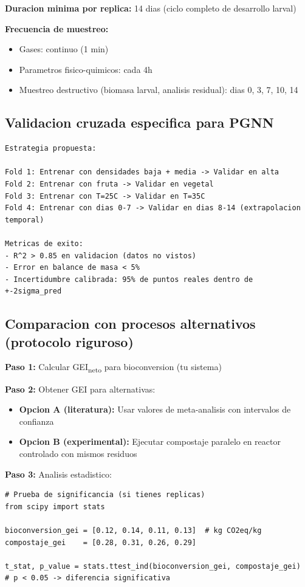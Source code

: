 \documentclass[12pt]{article}
\begin{document}
\textbf{Duracion minima por replica:} 14 dias (ciclo completo de desarrollo larval)

\textbf{Frecuencia de muestreo:}
\begin{itemize}
\item Gases: continuo (1 min)
\item Parametros fisico-quimicos: cada 4h
\item Muestreo destructivo (biomasa larval, analisis residual): dias 0, 3, 7, 10, 14
\end{itemize}

\subsection{Validacion cruzada especifica para PGNN}

\begin{lstlisting}[caption=Estrategia de validacion cruzada]
Estrategia propuesta:

Fold 1: Entrenar con densidades baja + media -> Validar en alta
Fold 2: Entrenar con fruta -> Validar en vegetal
Fold 3: Entrenar con T=25C -> Validar en T=35C
Fold 4: Entrenar con dias 0-7 -> Validar en dias 8-14 (extrapolacion temporal)

Metricas de exito:
- R^2 > 0.85 en validacion (datos no vistos)
- Error en balance de masa < 5%
- Incertidumbre calibrada: 95% de puntos reales dentro de +-2sigma_pred
\end{lstlisting}

\subsection{Comparacion con procesos alternativos (protocolo riguroso)}

\textbf{Paso 1:} Calcular GEI\textsubscript{neto} para bioconversion (tu sistema)

\textbf{Paso 2:} Obtener GEI para alternativas:
\begin{itemize}
\item \textbf{Opcion A (literatura):} Usar valores de meta-analisis \cite{ref54,ref64} con intervalos de confianza
\item \textbf{Opcion B (experimental):} Ejecutar compostaje paralelo en reactor controlado con mismos residuos
\end{itemize}

\textbf{Paso 3:} Analisis estadistico:

\begin{lstlisting}[caption=Prueba de significancia estadistica]
# Prueba de significancia (si tienes replicas)
from scipy import stats

bioconversion_gei = [0.12, 0.14, 0.11, 0.13]  # kg CO2eq/kg
compostaje_gei    = [0.28, 0.31, 0.26, 0.29]

t_stat, p_value = stats.ttest_ind(bioconversion_gei, compostaje_gei)
# p < 0.05 -> diferencia significativa
\end{lstlisting}
\end{document}
